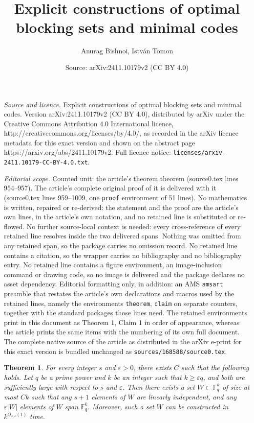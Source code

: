 \documentclass[10pt,a4paper]{amsart}
\title{Explicit constructions of optimal blocking sets and minimal codes}
\author{Anurag Bishnoi, Istv\'an Tomon}
\date{Source: arXiv:2411.10179v2 (CC BY 4.0)}
\newtheorem{theorem}{Theorem}
\begin{document}
\maketitle

\noindent\emph{Source and licence.} Explicit constructions of optimal blocking sets and minimal codes. Version arXiv:2411.10179v2 (CC BY 4.0), distributed by arXiv under the Creative Commons Attribution 4.0 International licence, http://creativecommons.org/licenses/by/4.0/, as recorded in the arXiv licence metadata for this exact version and shown on the abstract page https://arxiv.org/abs/2411.10179v2. Full licence notice: \texttt{licenses/arxiv-2411.10179-CC-BY-4.0.txt}.\par\smallskip

\noindent\textit{Editorial scope.} Counted unit: the article's theorem theorem (source0.tex lines 954--957). The article's complete original proof of it is delivered with it (source0.tex lines 959--1009, one \texttt{proof} environment of 51 lines). No mathematics is written, repaired or re-derived: the statement and the proof are the article's own lines, in the article's own notation, and no retained line is substituted or re-flowed.  No further source-local context is needed: every cross-reference of every retained line resolves inside the two delivered spans.  Nothing was omitted from any retained span, so the package carries no omission record.  No retained line contains a citation, so the wrapper carries no bibliography and no bibliography entry.  No retained line contains a figure environment, an image-inclusion command or drawing code, so no image is delivered and the package declares no asset dependency.  Editorial formatting only, in addition: an AMS \texttt{amsart} preamble that restates the article's own declarations and macros used by the retained lines, namely the environments \texttt{theorem}, \texttt{claim} on separate counters, together with the standard packages those lines need.  The retained environments print in this document as Theorem 1, Claim 1 in order of appearance, whereas the article prints the same items with the numbering of its own full document.  The complete native source of the article as distributed in the arXiv e-print for this exact version is bundled unchanged as \texttt{sources/168588/source0.tex}.
\begin{theorem}
    For every integer $s$ and $\varepsilon>0$, there exists $C$ such that the following holds. 
Let $q$ be a prime power and $k$ be an integer such that $k\geq \varepsilon q$, and both are sufficiently large with respect to $s$ and $\varepsilon$. Then there exists a set $W\subset \mathbb{F}_q^k$ of size at most $Ck$ such that any $s+1$ elements of $W$ are linearly independent, and any $\varepsilon |W|$ elements of $W$ span $\mathbb{F}_q^k$. Moreover, such a set $W$ can be constructed in $k^{O_{s,\varepsilon}(1)}$ time.
\end{theorem}
\end{document}
